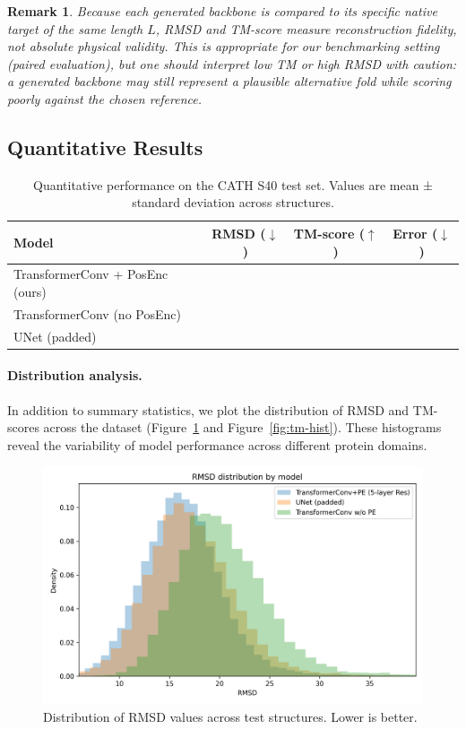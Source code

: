 \documentclass[a4paper,12pt]{article}
\newtheorem{remark}{Remark}[section]
\begin{document}
\begin{remark}
    Because each generated backbone is compared to its specific native target of the same length \(L\), RMSD and TM-score measure reconstruction fidelity, not absolute physical validity. This is appropriate for our benchmarking setting (paired evaluation), but one should interpret low TM or high RMSD with caution: a generated backbone may still represent a plausible alternative fold while scoring poorly against the chosen reference.
\end{remark}

\subsection{Quantitative Results}\label{subsec:results}

\begin{table}[htbp]
\centering
\caption{Quantitative performance on the CATH S40 test set. Values are mean ± standard deviation across structures.}
\label{tab:results}
\begin{tabular}{lccc}
\hline
Model & RMSD (\(\downarrow\)) & TM-score (\(\uparrow\)) & Error (\(\downarrow\)) \\
\hline
TransformerConv + PosEnc (ours) &   &   &   \\
TransformerConv (no PosEnc)     &   &   &   \\
UNet (padded)                   &   &   &   \\
\hline
\end{tabular}
\end{table}

\paragraph{Distribution analysis.}
In addition to summary statistics, we plot the distribution of RMSD and TM-scores across the dataset (Figure~\ref{fig:rmsd-hist} and Figure~\ref{fig:tm-hist}). 
These histograms reveal the variability of model performance across different protein domains.

\begin{figure}[htbp]
\centering
\includegraphics[width=0.7\linewidth]{rmsd_dist.png}
\caption{Distribution of RMSD values across test structures. Lower is better.}
\label{fig:rmsd-hist}
\end{figure}
\end{document}
